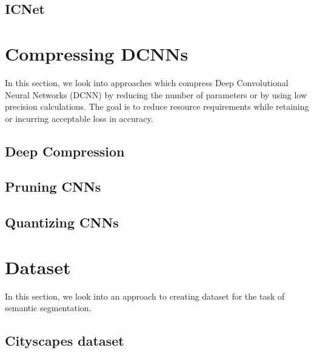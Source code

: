 \subsection{ICNet}

\section{Compressing DCNNs}
\label{section:compress}

In this section, we look into approaches which compress Deep Convolutional Neural Networks (DCNN) by reducing the number of parameters or by using low precision calculations. The goal is to reduce resource requirements while retaining or incurring acceptable loss in accuracy.

\subsection{Deep Compression}

\subsection{Pruning CNNs}

\subsection{Quantizing CNNs}

\section{Dataset}
\label{section:dataset}

In this section, we look into an approach to creating dataset for the task of semantic segmentation.

\subsection{Cityscapes dataset}


